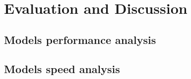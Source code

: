 \chapter{Evaluation and Discussion}\label{chap:eval}

\section{Models performance analysis}

\section{Models speed analysis}

